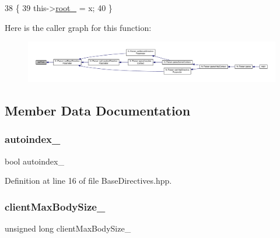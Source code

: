 \begin{DoxyCode}
38     \{
39         this->\hyperlink{classft_1_1_base_directives_abb1eaf0bba10b90172d6152e69457dc7}{root\_} = x;
40     \}
\end{DoxyCode}
Here is the caller graph for this function\+:
\nopagebreak
\begin{figure}[H]
\begin{center}
\leavevmode
\includegraphics[width=350pt]{classft_1_1_base_directives_a2a7990e309f7e38f2915dbbb0d2704cf_icgraph}
\end{center}
\end{figure}


\subsection{Member Data Documentation}
\mbox{\label{classft_1_1_base_directives_a4ebffbe32f50a462afa139c6f03c1a4f}} 
\subsubsection{\texorpdfstring{autoindex\+\_\+}{autoindex\_}}
{\footnotesize\ttfamily bool autoindex\+\_\+\hspace{0.3cm}{\ttfamily [protected]}}



Definition at line 16 of file Base\+Directives.\+hpp.

\mbox{\label{classft_1_1_base_directives_ad65c2594d2a90ca065d410dfd4066a19}} 
\subsubsection{\texorpdfstring{client\+Max\+Body\+Size\+\_\+}{clientMaxBodySize\_}}
{\footnotesize\ttfamily unsigned long client\+Max\+Body\+Size\+\_\+\hspace{0.3cm}{\ttfamily [protected]}}



